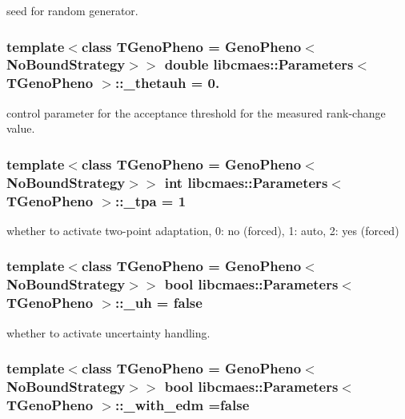 seed for random generator. \hypertarget{classlibcmaes_1_1Parameters_af125dad682b5a40f05ac42351f548ff9}{
\subsubsection[{\+\_\+thetauh}]{\setlength{\rightskip}{0pt plus 5cm}template$<$class T\+Geno\+Pheno = Geno\+Pheno$<$\+No\+Bound\+Strategy$>$$>$ double {\bf libcmaes\+::\+Parameters}$<$ T\+Geno\+Pheno $>$\+::\+\_\+thetauh = 0.\hspace{0.3cm}{\ttfamily [protected]}}}\label{classlibcmaes_1_1Parameters_af125dad682b5a40f05ac42351f548ff9}
control parameter for the acceptance threshold for the measured rank-\/change value. \hypertarget{classlibcmaes_1_1Parameters_a9f38bf1e37112abf71045225817cd30b}{
\subsubsection[{\+\_\+tpa}]{\setlength{\rightskip}{0pt plus 5cm}template$<$class T\+Geno\+Pheno = Geno\+Pheno$<$\+No\+Bound\+Strategy$>$$>$ int {\bf libcmaes\+::\+Parameters}$<$ T\+Geno\+Pheno $>$\+::\+\_\+tpa = 1\hspace{0.3cm}{\ttfamily [protected]}}}\label{classlibcmaes_1_1Parameters_a9f38bf1e37112abf71045225817cd30b}
whether to activate two-\/point adaptation, 0\+: no (forced), 1\+: auto, 2\+: yes (forced) \hypertarget{classlibcmaes_1_1Parameters_a4dc4905889ab02a2a74386875dc4f834}{
\subsubsection[{\+\_\+uh}]{\setlength{\rightskip}{0pt plus 5cm}template$<$class T\+Geno\+Pheno = Geno\+Pheno$<$\+No\+Bound\+Strategy$>$$>$ bool {\bf libcmaes\+::\+Parameters}$<$ T\+Geno\+Pheno $>$\+::\+\_\+uh = false\hspace{0.3cm}{\ttfamily [protected]}}}\label{classlibcmaes_1_1Parameters_a4dc4905889ab02a2a74386875dc4f834}
whether to activate uncertainty handling. \hypertarget{classlibcmaes_1_1Parameters_adbaa11317ae66061e097c372522b8758}{
\subsubsection[{\+\_\+with\+\_\+edm}]{\setlength{\rightskip}{0pt plus 5cm}template$<$class T\+Geno\+Pheno = Geno\+Pheno$<$\+No\+Bound\+Strategy$>$$>$ bool {\bf libcmaes\+::\+Parameters}$<$ T\+Geno\+Pheno $>$\+::\+\_\+with\+\_\+edm =false\hspace{0.3cm}{\ttfamily [protected]}}}\label{classlibcmaes_1_1Parameters_adbaa11317ae66061e097c372522b8758}

